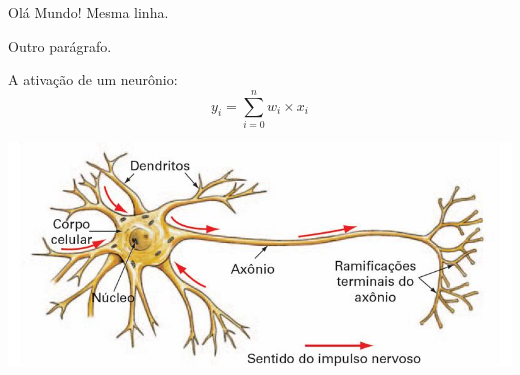 \documentclass[a4paper, 12pt]{article}
\begin{document}
Olá       Mundo!
Mesma linha.

Outro parágrafo.

A ativação de um neurônio:
\begin{equation}
y_i = \sum_{i=0}^{n} w_i \times x_i
\end{equation}

\includegraphics[scale=.5]{neuronio}
\end{document}
